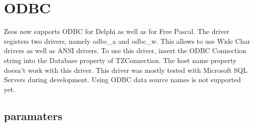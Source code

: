 \documentclass[a4paper,12pt,oneside]{article}
\begin{document}
\section{ODBC}
Zeos now supports ODBC for Delphi as well as for Free Pascal.
The driver registers two drivers, namely odbc\_a and odbc\_w.
This allows to use Wide Char drivers as well as ANSI drivers.
To use this driver, insert the ODBC Connection string into the Database property of TZConnection.
The host name property doesn't work with this driver.
This driver was mostly tested with Microsoft SQL Servers during development.
Using ODBC data source names is not supported yet.

\subsection{paramaters}
\end{document}
